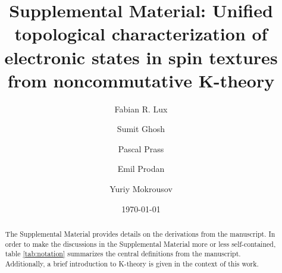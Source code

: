 \documentclass[
    aps,
    prb,
    twocolumn,
    floatfix,
    superscriptaddress,
	10pt
]{revtex4-2}
\begin{document}

\renewcommand{\arraystretch}{1.2}
\setcounter{secnumdepth}{2} 


\title{
	\texorpdfstring{
    Supplemental Material: Unified  topological characterization of electronic states in spin textures \\ from noncommutative K-theory
	}
	{
	Supplemental Material: Unified  topological characterization of electronic states in spin textures from noncommutative K-theory
	}
}

\author{Fabian R. Lux}
    \affiliation{\mainz\nyc}

\author{Sumit Ghosh}
   \affiliation{\pgi} 
   
\author{Pascal Prass}
    \affiliation{\mainz}
    
\author{Emil Prodan}
    \affiliation{\nyc}
    
\author{Yuriy Mokrousov}
    \affiliation{\pgi}
    \affiliation{\mainz}

\date{\today}


\begin{abstract}
	The Supplemental Material provides details on the derivations from the manuscript. 
	In order to make the discussions in the Supplemental Material more or less self-contained, table \ref{tab:notation} summarizes the central definitions from the manuscript.
	Additionally, a brief introduction to K-theory is given in the context of this work.
\end{abstract}


\maketitle

\onecolumngrid


\tableofcontents

\clearpage
\end{document}
